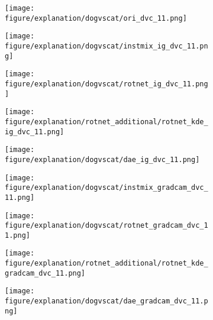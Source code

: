 \documentclass{article} \usepackage{iclr2021_conference,times}
\begin{document}
\begin{figure}[h!]
\centering
\begin{subfigure}{.11\textwidth}
  \centering
  \texttt{[image: figure/explanation/dogvscat/ori\_dvc\_11.png]}
\end{subfigure}
\hspace{-2mm}
\begin{subfigure}{.11\textwidth}
  \centering
  \texttt{[image: figure/explanation/dogvscat/instmix\_ig\_dvc\_11.png]}
\end{subfigure}
\hspace{-2mm}
\begin{subfigure}{.11\textwidth}
  \centering
  \texttt{[image: figure/explanation/dogvscat/rotnet\_ig\_dvc\_11.png]}
\end{subfigure}
\hspace{-2mm}
\begin{subfigure}{.11\textwidth}
  \centering
  \texttt{[image: figure/explanation/rotnet\_additional/rotnet\_kde\_ig\_dvc\_11.png]}
\end{subfigure}
\hspace{-2mm}
\begin{subfigure}{.11\textwidth}
  \centering
  \texttt{[image: figure/explanation/dogvscat/dae\_ig\_dvc\_11.png]}
\end{subfigure}
\hspace{-2mm}
\begin{subfigure}{.11\textwidth}
  \centering
  \texttt{[image: figure/explanation/dogvscat/instmix\_gradcam\_dvc\_11.png]}
\end{subfigure}
\hspace{-2mm}
\begin{subfigure}{.11\textwidth}
  \centering
  \texttt{[image: figure/explanation/dogvscat/rotnet\_gradcam\_dvc\_11.png]}
\end{subfigure}
\hspace{-2mm}
\begin{subfigure}{.11\textwidth}
  \centering
  \texttt{[image: figure/explanation/rotnet\_additional/rotnet\_kde\_gradcam\_dvc\_11.png]}
\end{subfigure}
\hspace{-2mm}
\begin{subfigure}{.11\textwidth}
  \centering
  \texttt{[image: figure/explanation/dogvscat/dae\_gradcam\_dvc\_11.png]}
\end{subfigure}\\

\end{figure}
\end{document}
